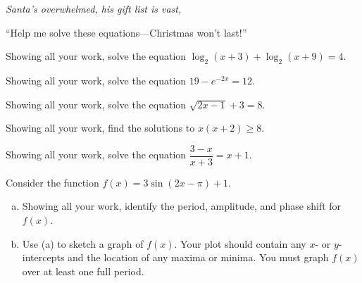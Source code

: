 \documentclass[12pt,letterpaper]{exam}
\begin{document}
\begin{questions}
\newpage
\hfill {\itshape Santa's overwhelmed, his gift list is vast, \hfill \phantom{XXXXXXXXXXX} \par
\hfill ``Help me solve these equations---Christmas won't last!''} \hfill \phantom{.} \par\vspace{0.3cm}



\question[10] Showing all your work, solve the equation $\log_2(x + 3) + \log_2(x + 9)= 4$. \vfill



\question[10] Showing all your work, solve the equation $19 - e^{-2x}= 12$. \vfill



\newpage
\question[10] Showing all your work, solve the equation $\sqrt{2x - 1} + 3= 8$. \vfill



\question[10] Showing all your work, find the solutions to $x(x + 2) \geq 8$. \vfill



\question[10] Showing all your work, solve the equation $\dfrac{3 - x}{x + 3}= x + 1$. \vfill



\newpage
{} \par\vspace{0.3cm}

Consider the function $f(x)= 3\sin(2x - \pi) + 1$.
	\begin{enumerate}[(a)]
	\item Showing all your work, identify the period, amplitude, and phase shift for $f(x)$. \vfill
	\item Use (a) to sketch a graph of $f(x)$. Your plot should contain any $x$- or $y$-intercepts and the location of any maxima or minima. You must graph $f(x)$ over at least one full period. \vfill
	\end{enumerate}



\newpage
{} \par\vspace{0.3cm}


\end{questions}
\end{document}
